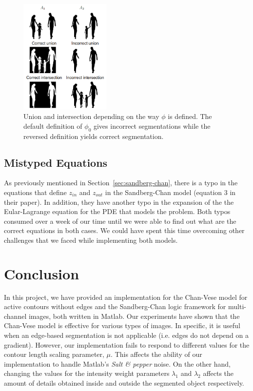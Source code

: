 \documentclass[10pt,twocolumn,letterpaper]{article}
\begin{document}
\begin{figure}[t]
\centering
\includegraphics[width=0.4\textwidth]{phidef.png}
\caption{Union and intersection depending on the way $\phi$ is defined. The default definition of $\phi_0$ gives incorrect segmentations while the reversed
definition yields correct segmentation.}
\label{fig:phidef}
\end{figure}

\subsection{Mistyped Equations}
As previously mentioned in Section~\ref{sec:sandberg-chan}, there is a typo in the equations that define $z_{in}$ and $z_{out}$ in the Sandberg-Chan model
(equation 3 in their paper). In addition, they have another typo in the expansion of the the Eular-Lagrange equation for the PDE that models the problem. Both
typos consumed over a week of our time until we were able to find out what are the correct equations in both cases. We could have spent this time overcoming
other challenges that we faced while implementing both models.

\section{Conclusion}
\label{sec:concl}
In this project, we have provided an implementation for the Chan-Vese model for active contours without edges and the Sandberg-Chan logic framework for
multi-channel images, both written in Matlab. Our experiments have shown that the Chan-Vese model is effective for various types of images. In specific, it is
useful when an edge-based segmentation is not applicable (i.e. edges do not depend on a gradient). However, our implementation fails to respond to different
values for the contour length scaling parameter, $\mu$. This affects the ability of our implementation to handle Matlab's \textit{Salt \& pepper} noise. On the
other hand, changing the values for the intensity weight parameters $\lambda_1$ and $\lambda_2$ affects the amount of details obtained inside and outside the
segmented object respectively.
\end{document}

